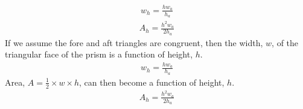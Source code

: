 \documentclass[letterpaper,10pt,english]{sphinxmanual}
\begin{document}
\begin{sphinxVerbatim}[commandchars=\\\{\}]
        

     
    

       
\end{sphinxVerbatim}
\begin{equation*}
\begin{split}\displaystyle w_{h} = \frac{h w_{a}}{h_{a}}\end{split}
\end{equation*}\begin{equation*}
\begin{split}\displaystyle A_{h} = \frac{h^{2} w_{a}}{2 h_{a}}\end{split}
\end{equation*}
\sphinxAtStartPar
If we assume the fore and aft triangles are congruent, then the width, \(w\), of the triangular face of the prism is a function of height, \(h\).
\begin{equation}\label{equation:README:width_from_height}
\begin{split}\displaystyle w_{h} = \frac{h w_{a}}{h_{a}}\end{split}
\end{equation}
\sphinxAtStartPar
Area, \(A = \frac{1}{2} \times w \times h\), can then become a function of height, \(h\).
\begin{equation}\label{equation:README:area_from_height}
\begin{split}\displaystyle A_{h} = \frac{h^{2} w_{a}}{2 h_{a}}\end{split}
\end{equation}
\end{document}
